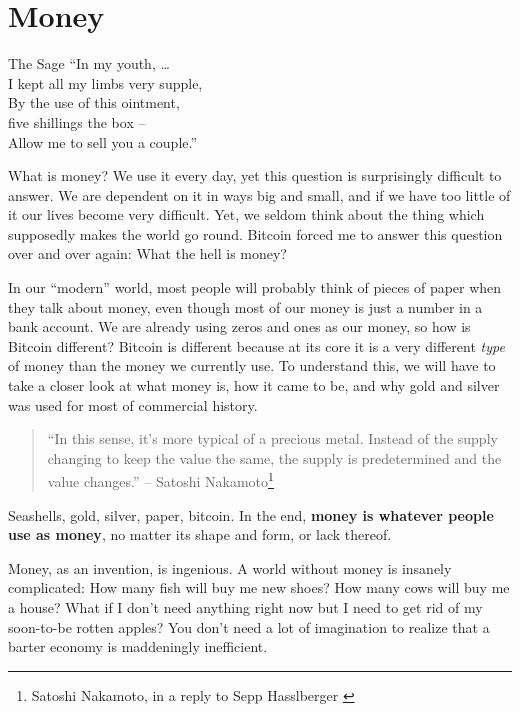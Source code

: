 \chapter{Money}
\label{les:11}

\begin{chapquote}{The Sage}
\enquote{In my youth, \ldots \\
I kept all my limbs very supple, \\
By the use of this ointment, \\
five shillings the box -- \\
Allow me to sell you a couple.}
\end{chapquote}

What is money? We use it every day, yet this question is surprisingly
difficult to answer. We are dependent on it in ways big and small, and
if we have too little of it our lives become very difficult. Yet, we
seldom think about the thing which supposedly makes the world go round.
Bitcoin forced me to answer this question over and over again: What the
hell is money?

In our \enquote{modern} world, most people will probably think of pieces of
paper when they talk about money, even though most of our money is just
a number in a bank account. We are already using zeros and ones as our
money, so how is Bitcoin different? Bitcoin is different because at its
core it is a very different \textit{type} of money than the money we currently
use. To understand this, we will have to take a closer look at what
money is, how it came to be, and why gold and silver was used for most
of commercial history.

\begin{samepage}\begin{quotation}
\enquote{In this sense, it's more typical of a precious metal. Instead of the
supply changing to keep the value the same, the supply is
predetermined and the value changes.}
\flushright -- Satoshi Nakamoto\footnote{Satoshi Nakamoto, in a reply to Sepp Hasslberger \cite{satoshi-precious-metal}}
\end{quotation}\end{samepage}

Seashells, gold, silver, paper, bitcoin. In the end, \textbf{money is whatever
people use as money}, no matter its shape and form, or lack thereof.

Money, as an invention, is ingenious. A world without money is insanely
complicated: How many fish will buy me new shoes? How many cows will buy
me a house? What if I don't need anything right now but I need to get
rid of my soon-to-be rotten apples? You don't need a lot of imagination
to realize that a barter economy is maddeningly inefficient.

